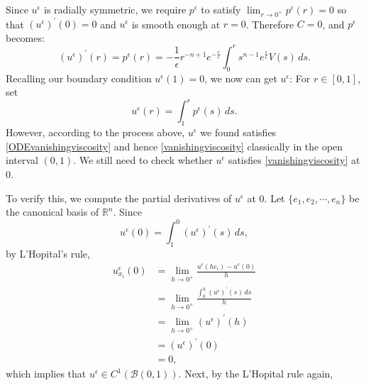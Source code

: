 \documentclass[12pt,reqno]{amsart}
\numberwithin{figure}{section}
\theoremstyle{plain}
\numberwithin{equation}{section}
\newcommand{\cB}{\mathcal{B}}
\begin{document}
Since $u^\epsilon$ is radially symmetric, we require $p^\epsilon$ to satisfy 
$\lim_{r\rightarrow 0^+}p^{\epsilon}(r)=0$ so that $(u^{\epsilon}) ^{'}(0)=0$ and $u^{\epsilon}$ is smooth enough at $r=0$. 
Therefore $C=0$, and $p^\epsilon$ becomes:
\begin{equation*}
      (u^{\epsilon})^{'}(r)= p^{\epsilon}(r)= -\frac{1}{\epsilon}r^{-n+1}e^{-\frac{r}{\epsilon}}  \int_{0}^{r} s^{n-1}e^{\frac{s}{\epsilon}}V(s)\,ds.
\end{equation*}
Recalling our boundary condition $u^{\epsilon}(1)=0$, we now can get $u^{\epsilon}$: For $r\in[0,1]$, set 
\begin{equation*}
    u^{\epsilon}(r) = \int_{1}^{r} p^{\epsilon}(s) \,ds.  
\end{equation*}
However, according to the process above, $u^{\epsilon}$ we found satisfies \eqref{ODEvanishingviscosity} and hence   \eqref{vanishingviscosity} classically in the open interval $(0,1)$. We still need to check whether $u^{\epsilon}$ satisfies \eqref{vanishingviscosity} at 0.

To verify this, we compute the partial derivatives of $u^{\epsilon}$ at 0.
Let $\{e_1,e_2,\cdots,e_n\}$ be the canonical basis of $\mathbb{R}^n$.
Since  
\begin{equation*}
    u^{\epsilon}(0)= \int_{1}^{0}(u^{\epsilon})^{'}(s)\,ds,   
\end{equation*}
by L'Hopital's rule,
\begin{equation*}
\begin{aligned}
    u_{x_i}^{\epsilon}(0) 
    &= \lim_{h \rightarrow 0^+}\frac{u^{\epsilon}(he_i)-u^{\epsilon}(0)}{h} \\
    &= \lim_{h \rightarrow 0^+} \frac{\int_{0}^{h}(u^{\epsilon})^{'}(s)\, ds}{h}\\
    &=\lim_{h\rightarrow 0^+}(u^{\epsilon})^{'}(h)\\
    &=(u^{\epsilon})^{'}(0)\\
    &=0,
\end{aligned}
\end{equation*}
which implies that $u^{\epsilon}\in C^1(\cB(0,1))$. Next, by the L'Hopital rule again,
\end{document}
